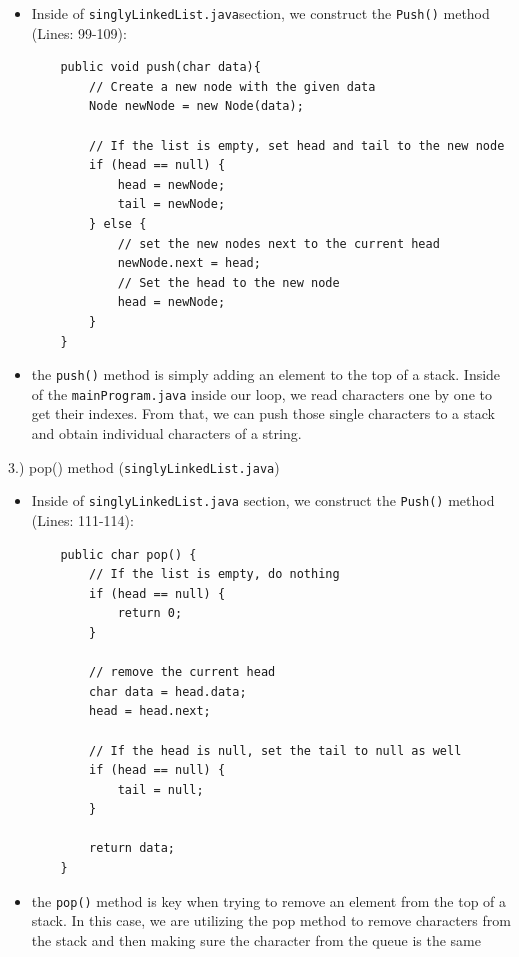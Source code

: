 \documentclass[a4paper,12pt]{article}
\begin{document}
\begin{itemize}
\item Inside of \verb|singlyLinkedList.java|section, we construct the \verb|Push()| method (Lines: 99-109):

\begin{verbatim}
    public void push(char data){
        // Create a new node with the given data
        Node newNode = new Node(data);
    
        // If the list is empty, set head and tail to the new node
        if (head == null) {
            head = newNode;
            tail = newNode;
        } else {
            // set the new nodes next to the current head
            newNode.next = head;
            // Set the head to the new node
            head = newNode;
        }
    }
\end{verbatim}
\item the \verb|push()| method is simply adding an element to the top of a stack. Inside of the \verb|mainProgram.java| inside our loop, we read characters one by one to get their indexes. From that, we can push those single characters to a stack and obtain individual characters of a string.\\

\end{itemize}

\begin{large}
    3.) pop() method (\verb|singlyLinkedList.java|)
\end{large}


\begin{itemize}
\item Inside of \verb|singlyLinkedList.java| section, we construct the \verb|Push()| method (Lines: 111-114):

\begin{verbatim}
    public char pop() {
        // If the list is empty, do nothing
        if (head == null) {
            return 0;
        }

        // remove the current head
        char data = head.data;
        head = head.next;

        // If the head is null, set the tail to null as well
        if (head == null) {
            tail = null;
        }

        return data;
    }
\end{verbatim}
\item the \verb|pop()| method is key when trying to remove an element from the top of a stack. In this case, we are utilizing the pop method to remove characters from the stack and then making sure the character from the queue is the same\\

\end{itemize}
\end{document}
